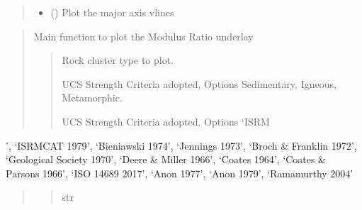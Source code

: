 \documentclass[letterpaper,10pt,english]{sphinxmanual}
\begin{document}
\begin{fulllineitems}
\begin{fulllineitems}
\begin{quote}
\begin{description}
\begin{itemize}
\item {} 
\sphinxAtStartPar
{} () \textendash{} Plot the major axis vlines

\end{itemize}

\sphinxAtStartPar


\sphinxAtStartPar


\end{description}\end{quote}

\end{fulllineitems}


\begin{fulllineitems}
\label{\detokenize{pyrockmodulus:pyrockmodulus.pyrockmodulus.modulus_ratio.initial_processing}}
\pysigstartsignatures
{}
\pysigstopsignatures\begin{quote}

\sphinxAtStartPar
Main function to plot the Modulus Ratio underlay
\begin{quote}\begin{description}
\sphinxAtStartPar
Rock cluster type to plot.

\sphinxAtStartPar
UCS Strength Criteria adopted. Options Sedimentary, Igneous, Metamorphic.

\sphinxAtStartPar
UCS Strength Criteria adopted. Options ‘ISRM

\end{description}\end{quote}
\end{quote}

’, ‘ISRMCAT
1979’, ‘Bieniawski
1974’, ‘Jennings
1973’, ‘Broch \& Franklin
1972’, ‘Geological Society
1970’, ‘Deere \& Miller
1966’, ‘Coates
1964’, ‘Coates \& Parsons
1966’, ‘ISO 14689
2017’, ‘Anon
1977’, ‘Anon
1979’, ‘Ramamurthy
2004’
\begin{quote}
\begin{quote}\begin{description}
\sphinxAtStartPar
str


\end{description}
\end{quote}
\end{quote}
\end{fulllineitems}
\end{fulllineitems}
\end{document}
